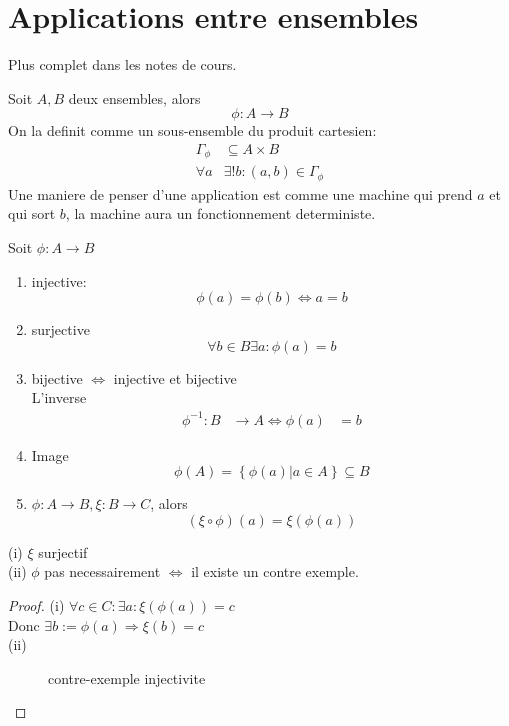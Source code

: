 \documentclass[../main.tex]{subfiles}
\begin{document}
\chapter{Applications entre ensembles}
Plus complet dans les notes de cours.\\
\begin{defn}\label{defn:formalisation_des_applications}
	Soit $A, B$ deux ensembles, alors 
	\[ 
	\phi : A \to B
	\]
	On la definit comme un sous-ensemble du produit cartesien:
	\begin{align*}
		\Gamma_\phi &\subseteq A \times B\\
		\forall a &\exists ! b: ( a,b) \in \Gamma_\phi
	\end{align*}
	Une maniere de penser d'une application est comme une machine qui prend $a$ et qui sort $b$, la machine aura un fonctionnement deterministe.
\end{defn}
\begin{propr}\label{propr:propriete_des_applications}
	Soit $\phi: A \to B$
	\begin{enumerate}
		\item injective:
			\[ 
				\phi(a) = \phi(b) \iff a=b
			\]
		\item surjective
			\[ 
				\forall b \in B \exists a : \phi(a)=b
			\]
		\item bijective $\iff$ injective et bijective\\
			L'inverse
			\begin{align*}
				\phi^{-1}: B &\to A
				\iff \phi(a) &= b
			\end{align*}
			
		\item Image
			\[ 
				\phi(A) = \left\{ \phi(a) \vert a \in A \right\} \subseteq B
			\]
		\item $\phi: A \to B, \xi :B \to C$, alors
			\[ 
				( \xi \circ \phi )(a) = \xi(\phi(a))
			\]
	\end{enumerate}
\end{propr}
\begin{propo}\label{propo:surjectivite_de_la_composition}
	(i) $\xi$ surjectif\\
	(ii) $\phi$ pas necessairement $\iff$ il existe un contre exemple.
\end{propo}
\begin{proof}
	(i) $\forall c \in C: \exists a: \xi(\phi(a))=c$\\
	Donc $\exists b :=\phi(a) \Rightarrow \xi(b)=c$\\
	(ii) 
\begin{figure}[ht]
    \centering
    \caption{contre-exemple injectivite}
    \label{fig:contre-exemple-injectivite}
\end{figure}
\end{proof}
\end{document}
